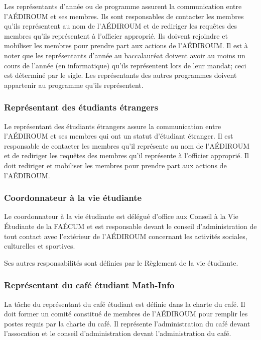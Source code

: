 \documentclass{aediroum}
\begin{document}
Les représentants d'année ou de programme assurent la communication entre l'AÉDIROUM et ses membres. Ils sont responsables de contacter les membres qu'ils représentent au nom de l'AÉDIROUM et de rediriger les requêtes des membres qu'ils représentent à l'officier approprié. Ils doivent rejoindre et mobiliser les membres pour prendre part aux actions de l'AÉDIROUM. Il est à noter que les représentants d'année au baccalauréat doivent avoir au moins un cours de l'année (en informatique) qu'ils représentent lors de leur mandat; ceci est déterminé par le sigle. Les représentants des autres programmes doivent appartenir au programme qu'ils représentent.

\subsubsection{Représentant des étudiants étrangers}\label{sec:representant-des-etudiants-etrangers}

Le représentant des étudiants étrangers assure la communication entre l'AÉDIROUM et ses membres qui ont un statut d'étudiant étranger. Il est responsable de contacter les membres qu'il représente au nom de l'AÉDIROUM et de rediriger les requêtes des membres qu'il représente à l'officier approprié. Il doit rediriger et mobiliser les membres pour prendre part aux actions de l'AÉDIROUM.

\subsubsection{Coordonnateur à la vie étudiante}\label{sec:coordonnateur-a-la-vie-etudiante}

Le coordonnateur à la vie étudiante est délégué d'office aux Conseil à la Vie Étudiante de la FAÉCUM et est responsable devant le conseil d'administration de tout contact avec l'extérieur de l'AÉDIROUM concernant les activités sociales, culturelles et sportives.

Ses autres responsabilités sont définies par le Règlement de la vie étudiante.

\subsubsection{Représentant du café étudiant Math-Info}\label{sec:representant-du-cafe-etudiant-math-info}

La tâche du représentant du café étudiant est définie dans la charte du café. Il doit former un comité constitué de membres de l'AÉDIROUM pour remplir les postes requis par la charte du café. Il représente l'administration du café devant l'assocation et le conseil d'administration devant l'administration du café.
\end{document}
